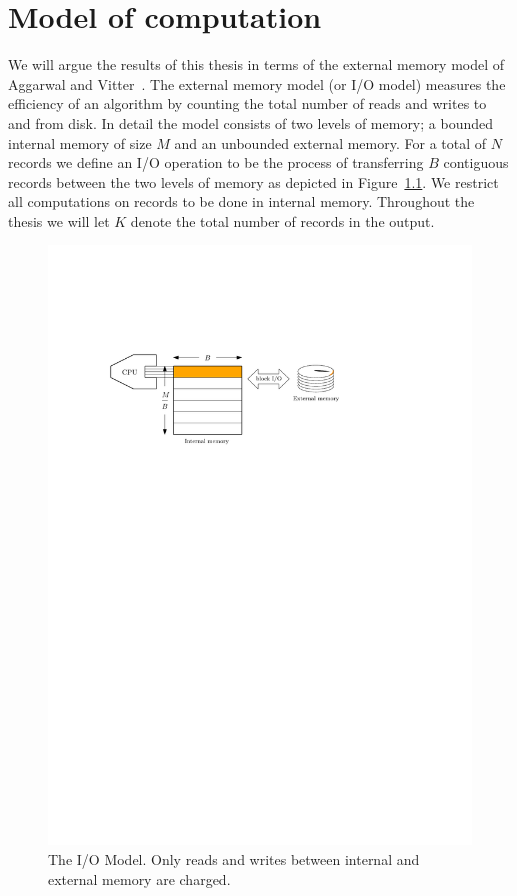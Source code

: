 \documentclass[twoside,11pt,openright]{report}
\begin{document}
\chapter{Model of computation}
\label{chp:iomodel}
We will argue the results of this thesis in terms of the external memory model of Aggarwal and Vitter~\cite{Aggarwal:1988/ICS/48529.48535}.
The external memory model (or I/O model) measures the efficiency of an algorithm by counting the total number of reads and writes to and from disk. In detail the model consists of two levels of memory; a bounded internal memory of size $M$ and an unbounded external memory. For a total of $N$ records we define an I/O operation to be the process of transferring $B$ contiguous records between the two levels of memory as depicted in Figure~\ref{fig:io_model}. We restrict all computations on records to be done in internal memory. Throughout the thesis we will let $K$ denote the total number of records in the output.

\begin{figure}[h]
	\centering
	\includegraphics[width=1\textwidth]{../figures/block_io}
	\caption{The I/O Model. Only reads and writes between internal and external memory are charged.}
	\label{fig:io_model}
\end{figure}
\end{document}
